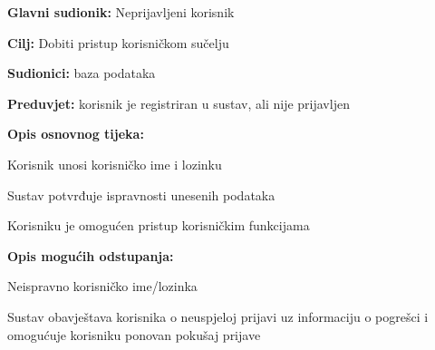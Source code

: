 					\noindent {}
					\begin{packed_item}
						
						\item \textbf{Glavni sudionik: }Neprijavljeni korisnik
						\item \textbf{Cilj:} Dobiti pristup korisničkom sučelju
						\item \textbf{Sudionici:} baza podataka
						\item \textbf{Preduvjet:} korisnik je registriran u sustav, ali nije prijavljen
						\item \textbf{Opis osnovnog tijeka:}
						\item[] \begin{packed_enum}
							\item Korisnik unosi korisničko ime i lozinku
							\item Sustav potvrđuje ispravnosti unesenih podataka
							\item Korisniku je omogućen pristup korisničkim funkcijama
						\end{packed_enum}
						
						\item  \textbf{Opis mogućih odstupanja:}
						
						\item[] \begin{packed_item}
							
							\item[2.a] Neispravno korisničko ime/lozinka
							\item[] \begin{packed_enum}
								
								\item Sustav obavještava korisnika o neuspjeloj prijavi uz informaciju o pogrešci i omogućuje korisniku ponovan pokušaj prijave
								
							\end{packed_enum}
						\end{packed_item}
					\end{packed_item}
					
